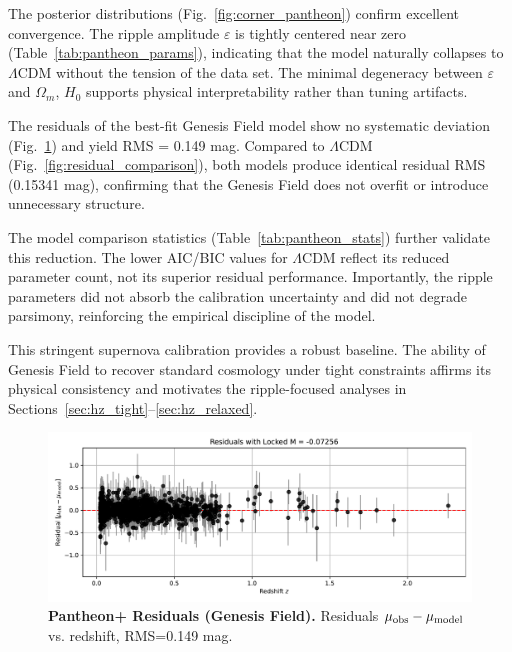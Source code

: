 The posterior distributions (Fig.~\ref{fig:corner_pantheon}) confirm excellent convergence. The ripple amplitude $\varepsilon$ is tightly centered near zero (Table~\ref{tab:pantheon_params}), indicating that the model naturally collapses to $\Lambda$CDM without the tension of the data set. The minimal degeneracy between $\varepsilon$ and $\Omega_m$, $H_0$ supports physical interpretability rather than tuning artifacts.

The residuals of the best-fit Genesis Field model show no systematic deviation (Fig.~\ref{fig:residuals_pantheon}) and yield RMS = 0.149 mag. Compared to $\Lambda$CDM (Fig.~\ref{fig:residual_comparison}), both models produce identical residual RMS (0.15341 mag), confirming that the Genesis Field does not overfit or introduce unnecessary structure.

The model comparison statistics (Table~\ref{tab:pantheon_stats}) further validate this reduction. The lower AIC/BIC values for $\Lambda$CDM reflect its reduced parameter count, not its superior residual performance. Importantly, the ripple parameters did not absorb the calibration uncertainty and did not degrade parsimony, reinforcing the empirical discipline of the model.

This stringent supernova calibration provides a robust baseline. The ability of Genesis Field to recover standard cosmology under tight constraints affirms its physical consistency and motivates the ripple-focused analyses in Sections~\ref{sec:hz_tight}–\ref{sec:hz_relaxed}.

\begin{figure}[htpb]
\centering
\includegraphics[width=\textwidth]{figures/sn_mcmc_residuals.pdf}
\caption{\textbf{Pantheon+ Residuals (Genesis Field).} Residuals $ \mu_{\rm obs} - \mu_{\rm model} $ vs. redshift, RMS=0.149 mag.}
\label{fig:residuals_pantheon}
\end{figure}

